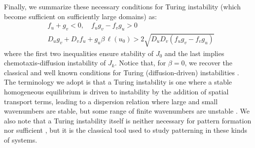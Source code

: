 \documentclass{article}
\newcommand{\jac}{J_{k}}
\begin{document}
{ Finally, we summarize these {necessary conditions for Turing instability (which become sufficient on sufficiently large domains) as:}
\begin{equation}
    \label{eq:suff_conditions_cd}
    \begin{aligned}
        & f_u + g_v < 0, \quad  f_u g_v - f_v g_u > 0 %
        \\
        & D_u g_v + D_v f_u + g_u \beta  \,\ell(u_0) > 2\sqrt{ D_u D_v \left( f_u g_v - f_v g_u \right)} %
        \end{aligned}
\end{equation}
where the first two inequalities ensure stability of $J_{0}$ and the last implies chemotaxis-diffusion instability of $\jac$.
Notice that, for $\beta=0$, we recover the classical and well known conditions for Turing (diffusion-driven) instabilities \cite{Murray_book2}. {The terminology we adopt is that a Turing instability is one where a stable homogeneous equilibrium is driven to instability by the addition of spatial transport terms, leading to a dispersion relation where large and small wavenumbers are stable, but some range of finite wavenumbers are unstable \cite{krause2021modern}. We also note that a Turing instability itself is neither necessary for pattern formation \cite{brauns2020phase, al2022stationary} nor sufficient \cite{krause2024turing}, but it is the classical tool used to study patterning in these kinds of systems.}

}
\end{document}
